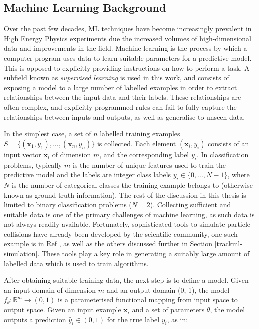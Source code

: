 \subsection{Machine Learning Background}

Over the past few decades, ML techniques have become increasingly prevalent in High Energy Physics experiments due the increased volumes of high-dimensional data and improvements in the field. Machine learning is the process by which a computer program uses data to learn suitable parameters for a predictive model. This is opposed to explicitly providing instructions on how to perform a task. A subfield known as \textit{supervised learning} is used in this work, and consists of exposing a model to a large number of labelled examples in order to extract relationships between the input data and their labels. These relationships are often complex, and explicitly programmed rules can fail to fully capture the relationships between inputs and outputs, as well as generalise to unseen data.

In the simplest case, a set of $n$ labelled training examples $S = \{(\textbf{x}_1, y_1), ..., (\textbf{x}_n, y_n)\}$ is collected. Each element $(\textbf{x}_i,y_i)$ consists of an input vector $\textbf{x}_i$ of dimension $m$, and the corresponding label $y_i$. In classification problems, typically $m$ is the number of unique features used to train the predictive model and the labels are integer class labels $y_i \in \{0,...,N − 1\}$, where $N$ is the number of categorical classes the training example belongs to (otherwise known as ground truth information). The rest of the discussion in this thesis is limited to binary classification problems ($N = 2$). Collecting sufficient and suitable data is one of the primary challenges of machine learning, as such data is not always readily available. Fortunately, sophisticated tools to simulate particle collisions have already been developed by the scientific community, one such example is in Ref \cite{Boos:2001cv}, as well as the others discussed further in Section \ref{trackml-simulation}. These tools play a key role in generating a suitably large amount of labelled data which is used to train algorithms.

After obtaining suitable training data, the next step is to define a model. Given an input domain of dimension $m$ and an output domain (0, 1), the model $f_{\theta} : \mathbb{R}^{m} \to (0, 1)$ is a parameterised functional mapping from input space to output space. Given an input example $\textbf{x}_i$ and a set of parameters $\theta$, the model outputs a prediction $\hat{y}_i \in (0, 1)$ for the true label $y_i$, as in:


